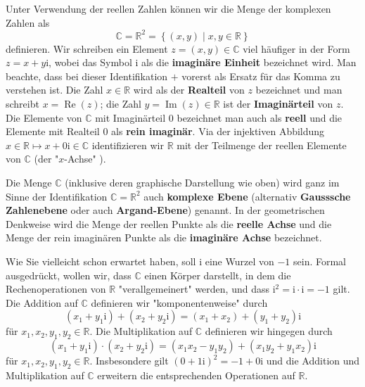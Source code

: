 \documentclass[../Analysis1_script.tex]{subfiles}
\begin{document}
Unter Verwendung der reellen Zahlen können wir die Menge der komplexen Zahlen als
\begin{equation}
	\mathbb {C} = \mathbb {R}^2 = \left \lbrace {(x,y)} \mid {x,y\in \mathbb {R}}\right \rbrace
\end{equation}
	definieren. Wir schreiben ein Element $z = (x,y) \in \mathbb {C}$ viel häufiger in der Form $z = x+y\mathrm{i}$, wobei das Symbol $\mathrm{i}$ als die \textbf{imaginäre Einheit} bezeichnet wird. Man beachte, dass bei dieser Identifikation $+$ vorerst als Ersatz für das Komma zu verstehen ist. Die Zahl $x \in \mathbb {R}$ wird als der \textbf{Realteil} von $z$ bezeichnet und man schreibt $x = \operatorname {Re}(z)$; die Zahl $y = \operatorname {Im}(z) \in \mathbb {R}$ ist der \textbf{Imaginärteil} von $z$. Die Elemente von $\mathbb {C}$ mit Imaginärteil $0$ bezeichnet man auch als \textbf{reell} und die Elemente mit Realteil $0$ als \textbf{rein imaginär}. Via der injektiven Abbildung $x\in \mathbb {R} \mapsto x+0\mathrm{i} \in \mathbb {C}$ identifizieren wir $\mathbb {R}$ mit der Teilmenge der reellen Elemente von $\mathbb {C}$ (der "$x$-Achse" ).
	
	
	
	Die Menge $\mathbb {C}$ (inklusive deren graphische Darstellung wie oben) wird ganz im Sinne der Identifikation $\mathbb {C} = \mathbb {R}^2$ auch \textbf{komplexe Ebene} (alternativ \textbf{Gausssche Zahlenebene} oder auch \textbf{Argand-Ebene}) genannt. In der geometrischen Denkweise wird die Menge der reellen Punkte als die \textbf{reelle Achse} und die Menge der rein imaginären Punkte als die \textbf{imaginäre Achse} bezeichnet.
	
	Wie Sie vielleicht schon erwartet haben, soll $\mathrm{i}$ eine Wurzel von $-1$ sein. Formal ausgedrückt, wollen wir, dass $\mathbb {C}$ einen Körper darstellt, in dem die Rechenoperationen von $\mathbb {R}$ "verallgemeinert" werden, und dass $\mathrm {i}^2 = \mathrm{i} \cdot \mathrm{i} = -1$ gilt. Die Addition auf $\mathbb {C}$ definieren wir "komponentenweise" durch
	\begin{equation}
		(x_1+y_1\mathrm{i}) + (x_2+y_2\mathrm{i}) = (x_1+x_2) + (y_1+y_2)\mathrm{i}
	\end{equation}  
	für $x_1,x_2,y_1,y_2 \in \mathbb {R}$. Die Multiplikation auf $\mathbb{C}$ definieren wir hingegen durch 
	\begin{equation}
		(x_1+y_1\mathrm {i})\cdot (x_2+y_2\mathrm {i}) = (x_1x_2-y_1y_2) + (x_1y_2+y_1x_2)\mathrm {i}
	\end{equation}
	für $x_1,x_2,y_1,y_2 \in \mathbb {R}$. Insbesondere gilt $(0+1 \mathrm {i})^2 = -1+0\mathrm {i}$ und die Addition und Multiplikation auf $\mathbb {C}$ erweitern die entsprechenden Operationen auf $\mathbb {R}$.
	
\end{document}
